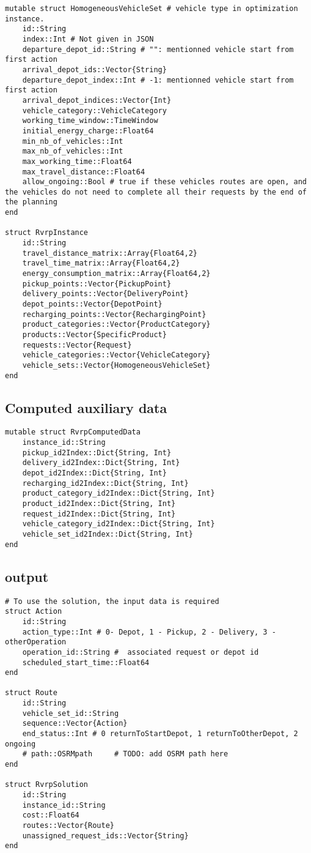 \documentclass[12pt,a4paper]{article}
\begin{document}
\begin{verbatim}
mutable struct HomogeneousVehicleSet # vehicle type in optimization instance.
    id::String
    index::Int # Not given in JSON
    departure_depot_id::String # "": mentionned vehicle start from first action
    arrival_depot_ids::Vector{String}
    departure_depot_index::Int # -1: mentionned vehicle start from first action
    arrival_depot_indices::Vector{Int}
    vehicle_category::VehicleCategory
    working_time_window::TimeWindow
    initial_energy_charge::Float64
    min_nb_of_vehicles::Int
    max_nb_of_vehicles::Int
    max_working_time::Float64 
    max_travel_distance::Float64
    allow_ongoing::Bool # true if these vehicles routes are open, and the vehicles do not need to complete all their requests by the end of the planning
end

struct RvrpInstance
    id::String
    travel_distance_matrix::Array{Float64,2}
    travel_time_matrix::Array{Float64,2}
    energy_consumption_matrix::Array{Float64,2}
    pickup_points::Vector{PickupPoint}
    delivery_points::Vector{DeliveryPoint}
    depot_points::Vector{DepotPoint}
    recharging_points::Vector{RechargingPoint}
    product_categories::Vector{ProductCategory}
    products::Vector{SpecificProduct}
    requests::Vector{Request}
    vehicle_categories::Vector{VehicleCategory}
    vehicle_sets::Vector{HomogeneousVehicleSet}
end
\end{verbatim}




\subsection{Computed auxiliary data}
\begin{verbatim}
mutable struct RvrpComputedData
    instance_id::String
    pickup_id2Index::Dict{String, Int}
    delivery_id2Index::Dict{String, Int}
    depot_id2Index::Dict{String, Int}
    recharging_id2Index::Dict{String, Int}
    product_category_id2Index::Dict{String, Int}
    product_id2Index::Dict{String, Int}
    request_id2Index::Dict{String, Int}
    vehicle_category_id2Index::Dict{String, Int}
    vehicle_set_id2Index::Dict{String, Int}
end
\end{verbatim}


\subsection{output}

\begin{verbatim}
# To use the solution, the input data is required
struct Action
    id::String
    action_type::Int # 0- Depot, 1 - Pickup, 2 - Delivery, 3 - otherOperation
    operation_id::String #  associated request or depot id
    scheduled_start_time::Float64
end

struct Route
    id::String
    vehicle_set_id::String
    sequence::Vector{Action}
    end_status::Int # 0 returnToStartDepot, 1 returnToOtherDepot, 2 ongoing
    # path::OSRMpath     # TODO: add OSRM path here
end

struct RvrpSolution
    id::String
    instance_id::String
    cost::Float64
    routes::Vector{Route}
    unassigned_request_ids::Vector{String}
end
\end{verbatim}
\end{document}
